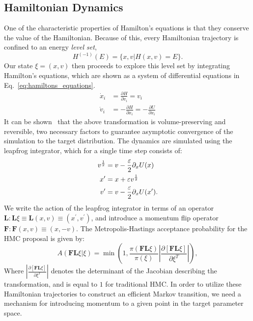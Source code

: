 \subsection{Hamiltonian Dynamics}%
\label{subsec:mcmc_hamiltonian_dynamics}
One of the characteristic properties of Hamilton's equations is that they
conserve the value of the Hamiltonian.
%
Because of this, every Hamiltonian trajectory is confined to an energy
\emph{level set},
%
\begin{equation}
H^{(-1)}(E) = \{x, v | H(x, v) = E\}.
\end{equation}
%
Our state $\xi = (x, v)$ then proceeds to explore this level set by integrating
Hamilton's equations, which are shown as a system of differential equations in
Eq.~\ref{eq:hamiltons_equations}.
%
%
\begin{align}
  \dot x_i &= \frac{\partial H}{\partial v_i} = v_i\\
  \dot v_i &= -\frac{\partial H}{\partial x_i} = - \frac{\partial
      U}{\partial x_i}
\label{eq:hamiltons_equations}
\end{align}
%
It can be shown~\cite{Neal_2012} that the above transformation is
volume-preserving and reversible, two necessary factors to guarantee asymptotic
convergence of the simulation to the target distribution.
%
The dynamics are simulated using the leapfrog integrator, which for a single
time step consists of:
%
\begin{align}
  v^{\frac{1}{2}} &= v - \frac{{\varepsilon}}{2} \partial_x U(x)\\
  x^{\prime} &= x + {\varepsilon} v^{\frac{1}{2}}\\
  v^{\prime} &= v - \frac{{\varepsilon}}{2} \partial_x U(x^{\prime}).
  \label{eq:generic_leapfrog}
\end{align}
%
We write the action of the leapfrog integrator in terms of an operator
$\mathbf{L}: \mathbf{L}\xi \equiv \mathbf{L}(x, v) \equiv (x^{\prime},
v^{\prime})$, and introduce a momentum flip operator $\mathbf{F}: \mathbf{F}(x,
v) \equiv (x, -v)$.
%
The Metropolis-Hastings acceptance probability for the HMC proposal is given
by:
%
\begin{equation}
  A(\mathbf{F}\mathbf{L} \xi | \xi) = \min\left(1,
      \frac{\pi(\mathbf{F}\mathbf{L}\xi)}{\pi(\xi)}\left|
      \frac{\partial\left[\mathbf{F}\mathbf{L}\xi\right]}
      {\partial\xi^{T}}\right|\right),
\label{eq:metropolis_hastings}
\end{equation}
%
Where $\left|\frac{\partial\left[\mathbf{F}\mathbf{L}\xi\right]}
{\partial\xi^{T}}\right|$ denotes the determinant of the Jacobian describing
the transformation, and is equal to $1$ for traditional HMC.\@
%
In order to utilize these Hamiltonian trajectories to construct an efficient
Markov transition, we need a mechanism for introducing momentum to a given
point in the target parameter space.

